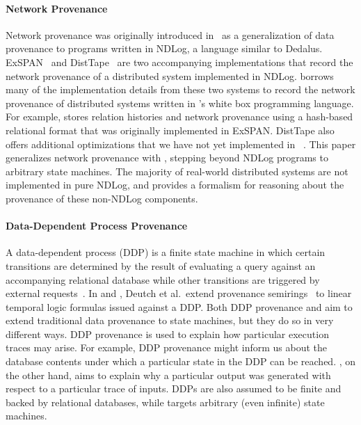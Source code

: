 \paragraph{Network Provenance}
Network provenance was originally introduced in~\cite{zhou2010efficient} as a
generalization of data provenance to programs written in NDLog, a language
similar to Dedalus. ExSPAN~\cite{zhou2010efficient} and
DistTape~\cite{zhou2012distributed} are two accompanying implementations that
record the network provenance of a distributed system implemented in NDLog.
\fluent{} borrows many of the implementation details from these two systems to
record the network provenance of distributed systems written in \fluent{}'s
white box programming language. For example, \fluent{} stores relation
histories and network provenance using a hash-based relational format that was
originally implemented in ExSPAN. DistTape also offers additional optimizations
that we have not yet implemented in \fluent{}~\cite{zhou2012distributed,
chen2017distributed}.
This paper generalizes network provenance with \watprovenance{}, stepping
beyond NDLog programs to arbitrary state machines. The majority of real-world
distributed systems are not implemented in pure NDLog, and \watprovenance{}
provides a formalism for reasoning about the provenance of these non-NDLog
components.

\paragraph{Data-Dependent Process Provenance}
A data-dependent process (DDP) is a finite state machine in which certain
transitions are determined by the result of evaluating a query against an
accompanying relational database while other transitions are triggered by
external requests~\cite{deutch2014provenance, deutch2015provenance}. In
\cite{deutch2014provenance} and \cite{deutch2015provenance}, Deutch et al.\
extend provenance semirings~\cite{green2007provenance} to linear temporal logic
formulas issued against a DDP.
%
Both DDP provenance and \watprovenance{} aim to extend traditional data
provenance to state machines, but they do so in very different ways. DDP
provenance is used to explain how particular execution traces may arise. For
example, DDP provenance might inform us about the database contents under which
a particular state in the DDP can be reached. \Watprovenance{}, on the other
hand, aims to explain why a particular output was generated with respect to a
particular trace of inputs. DDPs are also assumed to be finite and backed by
relational databases, while \watprovenance{} targets arbitrary (even infinite)
state machines.

